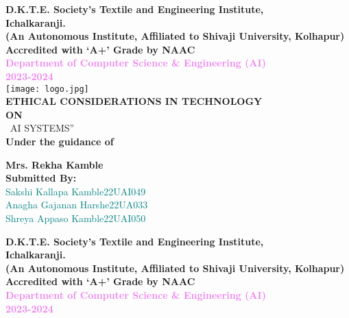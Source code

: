\documentclass{article}
\begin{document}
\begin{center}
{\fontsize{16}{19.2}\selectfont \textbf{D.K.T.E. Society’s Textile and Engineering Institute,\\
Ichalkaranji.\\[0.5cm]}} %
{\fontsize{14}{19.2}\selectfont \textbf{(An Autonomous Institute, Affiliated to Shivaji University, Kolhapur)\\
Accredited with ‘A+’ Grade by NAAC}}\\[0.5cm]

\textcolor{violet}{\fontsize{14}{19.2}\selectfont \textbf{Department of Computer Science \& Engineering (AI)\\[0.2cm]
2023-2024}}\\[1cm]
\texttt{[image: logo.jpg]} %
\vspace{0.5cm}
\\
{\fontsize{13}{19.2}\selectfont \textbf{ETHICAL CONSIDERATIONS IN TECHNOLOGY\\
ON}}\\[0.18cm]
{\fontsize{15}{19.2}\selectfont\ AI SYSTEMS\textup{}”}\\[1.5cm]
{\fontsize{14}{19.2}\selectfont \textbf{Under the guidance of}\\[0.5cm]}
{\fontsize{12}{19.2}\selectfont \textbf{ Mrs. Rekha Kamble}\\[1cm]
{\fontsize{14}{19.2}\textbf{Submitted By:}}\\[0.5cm]
{\fontsize{12}{19.2}\textcolor{teal}{\fontsize{12}{19.2}\selectfont  \quad Sakshi Kallapa Kamble\quad\quad\quad\quad\quad\quad\quad22UAI049}}\\
{\fontsize{12}{19.2}\textcolor{teal}{\fontsize{12}{19.2}\selectfont  \quad Anagha Gajanan Harshe\quad\quad\quad\quad\quad\quad\quad 22UA033}}\\
{\fontsize{12}{19.2}\textcolor{teal}{\fontsize{12}{19.2}\selectfont  \quad Shreya Appaso Kamble\quad\quad\quad\quad\quad\quad\quad 22UAI050}}
\clearpage
\begin{center}
{\fontsize{16}{19.2}\selectfont \textbf{D.K.T.E. Society’s Textile and Engineering Institute,\\
Ichalkaranji.\\[0.5cm]}} %
{\fontsize{14}{19.2}\selectfont \textbf{(An Autonomous Institute, Affiliated to Shivaji University, Kolhapur)\\
Accredited with ‘A+’ Grade by NAAC}}\\[0.5cm]
\textcolor{violet}{\fontsize{14}{19.2}\selectfont \textbf{Department of Computer Science \& Engineering (AI)\\[0.2cm]
2023-2024}}\\[1cm]
    \vspace{0.5cm}
    

\end{center}}
\end{center}
\end{document}
